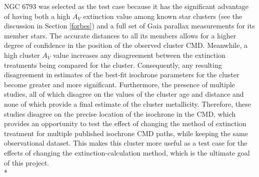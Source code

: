 \documentclass[12pt, a4paper]{report}
\begin{document}
NGC 6793 was selected as the test case because it has the significant advantage of having both a high $A_{V}$ extinction value among known star clusters (see the discussion in Section \ref{forbes}) and a full set of Gaia parallax measurements for its member stars. The accurate distances to all its members allows for a higher degree of confidence in the position of the observed cluster CMD. Meanwhile, a high cluster $A_{V}$ value increases any disagreement between the extinction treatments being compared for the cluster. Consequently, any resulting disagreement in estimates of the best-fit isochrone parameters for the cluster become greater and more significant. Furthermore, the presence of multiple studies, all of which disagree on the values of the cluster age and distance and none of which provide a final estimate of the cluster metallicity. Therefore, these studies disagree on the precise location of the isochrone in the CMD, which provides an opportunity to test the effect of changing the method of extinction treatment for multiple published isochrone CMD paths, while keeping the same observational dataset. This makes this cluster more useful as a test case for the effects of changing the extinction-calculation method, which is the ultimate goal of this project.  \\*

\begin{table}
\begin{center}
\caption{Observational parameters for NGC 6793, according to \cite{2005A&A...438.1163K} (K05, WEBDA archive page), \cite{2013A&A...558A..53K} (K13, VizieR archive page) and \cite{2018A&A...616A..10G} (GC18), respectively.}
\label{NGC6793_obs}
\end{center}
\end{table}
\end{document}
